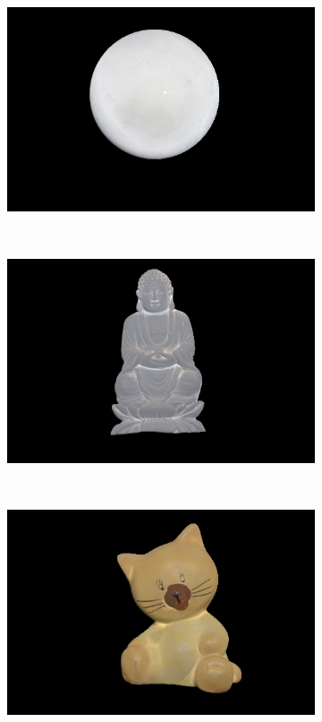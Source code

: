 \documentclass{paper}
\begin{document}
\begin{figure}[h!]
    \centering
    \begin{subfigure}{0.3\textwidth}
        \includegraphics[width=\textwidth]{results/gray/gray_a_rgb}
    \end{subfigure}
    ~
    \begin{subfigure}{0.3\textwidth}
        \includegraphics[width=\textwidth]{results/buddha/buddha_a_rgb}
    \end{subfigure}
    ~
    \begin{subfigure}{0.3\textwidth}
        \includegraphics[width=\textwidth]{results/cat/cat_a_rgb}
    \end{subfigure}
    

\end{figure}
\end{document}
